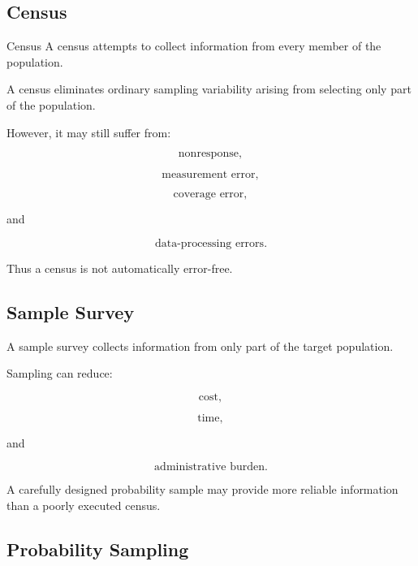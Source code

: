 \subsection{Census}
\label{subsec:census}

\begin{definitionbox}{Census}
A census attempts to collect information from every member of the
population.
\end{definitionbox}

A census eliminates ordinary sampling variability arising from selecting
only part of the population.

However, it may still suffer from:

\[
\boxed{
\text{nonresponse},
}
\]

\[
\boxed{
\text{measurement error},
}
\]

\[
\boxed{
\text{coverage error},
}
\]

and

\[
\boxed{
\text{data-processing errors}.
}
\]

Thus a census is not automatically error-free.

\subsection{Sample Survey}
\label{subsec:sample-survey}

A sample survey collects information from only part of the target
population.

Sampling can reduce:

\[
\text{cost},
\]

\[
\text{time},
\]

and

\[
\text{administrative burden}.
\]

A carefully designed probability sample may provide more reliable
information than a poorly executed census.

\subsection{Probability Sampling}
\label{subsec:probability-sampling}

